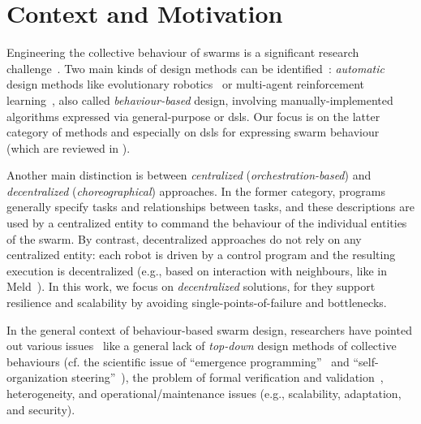 \section{Context and Motivation}
\label{sec:context}

Engineering the collective behaviour of swarms is 
 a significant research challenge~\cite{DBLP:journals/swarm/BrambillaFBD13}.
%
Two main kinds of design methods can be identified~\cite{DBLP:journals/swarm/BrambillaFBD13}:
 \emph{automatic} design methods like evolutionary robotics~\cite{DBLP:series/sci/2008-108} or multi-agent reinforcement learning~\cite{DBLP:journals/tsmc/BusoniuBS08},
 also called \emph{behaviour-based} design, involving manually-implemented algorithms expressed via general-purpose or \acp{dsl}.
%
Our focus is on the latter category of methods and especially on \acp{dsl} for expressing swarm behaviour (which are reviewed in ).
%

Another main distinction is between \emph{centralized} (\emph{orchestration-based}) and \emph{decentralized} (\emph{choreographical}) approaches.
%
In the former category,
 programs generally specify tasks and relationships between tasks, %
 and these descriptions are used by a centralized entity
 to command the behaviour of the individual entities of the swarm.
%
By contrast,
 decentralized approaches
 do not rely on any centralized entity:
 each robot is driven by a control program 
 and the resulting execution is decentralized
 (e.g., based on interaction with neighbours, like in Meld~\cite{Meld2007}).
%
In this work, we focus on \emph{decentralized} solutions, for they support resilience and scalability by avoiding single-points-of-failure and bottlenecks.


In the general context of behaviour-based swarm design,
 researchers have pointed out various issues~\cite{DBLP:journals/swarm/BrambillaFBD13,DBLP:journals/scirobotics/TheraulazT20}
 like a general lack
 of \emph{top-down} design methods of collective behaviours
 (cf. the scientific issue of ``emergence programming''~\cite{varenne2015programming-emergence} and  ``self-organization steering''~\cite{DBLP:journals/alife/GershensonTWS20}),
 the problem of formal verification and validation~\cite{DBLP:journals/csur/LuckcuckFDDF19},
 heterogeneity, 
 and operational/maintenance issues
 (e.g., scalability, adaptation, and security). 
%
%

